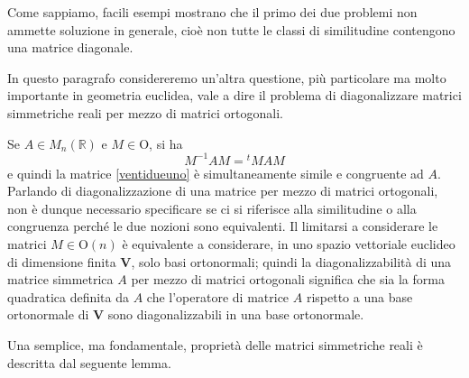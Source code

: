 \documentclass{article}
\theoremstyle{plain}
\theoremstyle{definition}
\theoremstyle{remark}
\begin{document}
\vspace{10pt}

Come sappiamo, facili esempi mostrano che il primo dei due problemi non ammette soluzione in generale, 
cioè non tutte le classi di similitudine contengono una matrice diagonale.

\vspace{10pt}

In questo paragrafo considereremo un'altra questione, più particolare ma molto importante in geometria 
euclidea, vale a dire il problema di diagonalizzare matrici simmetriche reali per mezzo di matrici ortogonali.

\vspace{10pt}

Se $A \in M_n(\mathbb{R})$ e $M \in \mathrm{O}$, si ha
\begin{equation}\label{ventidueuno}
M^{-1}AM = {}^tMAM 
\end{equation}
e quindi la matrice \ref{ventidueuno} è simultaneamente simile e congruente ad $A$. Parlando di diagonalizzazione 
di una matrice per mezzo di matrici ortogonali, non è dunque necessario specificare se ci si riferisce 
alla similitudine o alla congruenza perché le due nozioni sono equivalenti. Il limitarsi a considerare le 
matrici $M \in \mathrm{O}(n)$ è equivalente a considerare, in uno spazio vettoriale euclideo di dimensione finita 
$\mathbf{V}$, solo basi ortonormali; quindi la diagonalizzabilità di una matrice simmetrica $A$ per mezzo di matrici 
ortogonali significa che sia la forma quadratica definita da $A$ che l'operatore di matrice $A$ rispetto a 
una base ortonormale di $\mathbf{V}$ sono diagonalizzabili in una base ortonormale.

\vspace{10pt}

Una semplice, ma fondamentale, proprietà delle matrici simmetriche reali è descritta dal seguente lemma.

\vspace{10pt}
\end{document}
